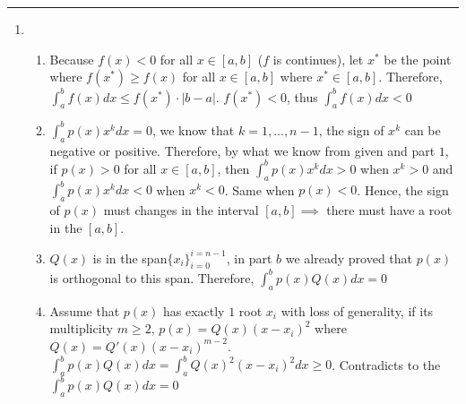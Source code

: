 \documentclass[11pt]{article}
\begin{document}





\begin{quote}

\end{quote}

\hrule

\begin{solution}
\item 

\begin{enumerate}
    \item 
        \begin{enumerate}
            \item Because $f(x) < 0$ for all $x \in [a,b]$ ($f$ is continues), let $x^*$ be the point where $f(x^*) \geq f(x)$ for all $x \in [a,b]$ where $x^* \in [a,b]$. Therefore, $\int_{a}^{b} f(x)dx \leq f(x^*)\cdot|b-a|$. $f(x^*) < 0$, thus $\int_{a}^{b} f(x)dx < 0$\\
            
            \item $\int_{a}^{b} p(x)x^kdx = 0$, we know that $k = 1, ... ,n-1$, the sign of $x^k$ can be negative or positive. Therefore, by what we know from given and part $1$, if $p(x) > 0$ for all $x \in [a,b]$, then $\int_{a}^{b} p(x)x^kdx > 0$ when $x^k > 0$ and $\int_{a}^{b} p(x)x^kdx < 0$ when $x^k < 0$. Same when $p(x) < 0$. Hence, the sign of $p(x)$ must changes in the interval $[a,b] \implies$ there must have a root in the $[a,b]$.\\
            
            \item $Q(x)$ is in the span$\{x_i\}_{i=0}^{i=n-1}$, in part $b$ we already proved that $p(x)$ is orthogonal to this span. Therefore, $\int_{a}^{b} p(x)Q(x)dx = 0$\\
            
            \item Assume that $p(x)$ has exactly $1$ root $x_i$ with loss of generality, if its multiplicity $m \geq 2$, $p(x) = Q(x)(x-x_i)^2$ where $Q(x) = Q'(x)(x-x_i)^{m-2}$.\\
            
            $\int_{a}^{b} p(x)Q(x)dx = \int_{a}^{b} Q(x)^2 (x-x_i)^2dx \geq 0$. Contradicts to the $\int_{a}^{b} p(x)Q(x)dx = 0$\\
            

\end{enumerate}
\end{enumerate}
\end{solution}
\end{document}
